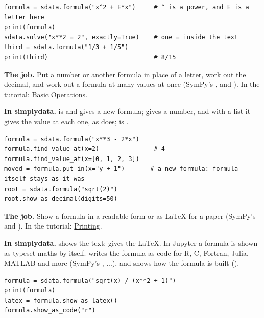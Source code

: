 \begin{lstlisting}[style=py]
formula = sdata.formula("x^2 + E*x")     # ^ is a power, and E is a letter here
print(formula)
sdata.solve("x**2 = 2", exactly=True)    # one = inside the text
third = sdata.formula("1/3 + 1/5")
print(third)                             # 8/15
\end{lstlisting}


\textbf{The job.} Put a number or another formula in place of a letter, work out the decimal, and work
out a formula at many values at once (SymPy's ,  and ). In the
tutorial: \href{https://docs.sympy.org/latest/tutorials/intro-tutorial/basic_operations.html}{Basic
Operations}.

\textbf{In simplydata.}  is  and gives a new formula;
 gives a number, and with a list it gives the value at each one,
as  does;  is .

\begin{lstlisting}[style=py]
formula = sdata.formula("x**3 - 2*x")
formula.find_value_at(x=2)               # 4
formula.find_value_at(x=[0, 1, 2, 3])
moved = formula.put_in(x="y + 1")       # a new formula: formula itself stays as it was
root = sdata.formula("sqrt(2)")
root.show_as_decimal(digits=50)
\end{lstlisting}


\textbf{The job.} Show a formula in a readable form or as LaTeX for a paper (SymPy's  and
). In the tutorial: \href{https://docs.sympy.org/latest/tutorials/intro-tutorial/printing.html}%
{Printing}.

\textbf{In simplydata.}  shows the text;  gives
the LaTeX. In Jupyter a formula is shown as typeset maths by itself.  writes
the formula as code for R, C, Fortran, Julia, MATLAB and more (SymPy's ,  ...), and
 shows how the formula is built ().

\begin{lstlisting}[style=py]
formula = sdata.formula("sqrt(x) / (x**2 + 1)")
print(formula)
latex = formula.show_as_latex()
formula.show_as_code("r")
\end{lstlisting}

